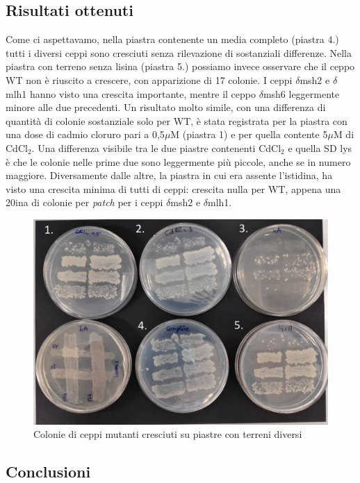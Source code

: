  \subsection*{Risultati ottenuti}
	Come ci aspettavamo, nella piastra contenente un media completo (piastra 4.) tutti i diversi ceppi sono cresciuti senza rilevazione di sostanziali differenze. Nella piastra con terreno senza lisina (piastra 5.) possiamo invece osservare che il ceppo WT non è riuscito a crescere, con apparizione di 17 colonie. I ceppi $\delta$msh2 e $\delta$mlh1 hanno visto una crescita importante, mentre il ceppo $\delta$msh6 leggermente minore alle due precedenti. Un risultato molto simile, con una differenza di quantità di colonie sostanziale solo per WT, è stata registrata per la piastra con una dose di cadmio cloruro pari a 0,5$\mu$M (piastra 1) e per quella contente 5$\mu$M di CdCl$_{2}$. Una differenza visibile tra le due piastre contenenti CdCl$_{2}$ e quella SD lys è che le colonie nelle prime due sono leggermente più piccole, anche se in numero maggiore. Diversamente dalle altre, la piastra in cui era assente l'istidina, ha visto una crescita minima di tutti di ceppi: crescita nulla per WT, appena una 20ina di colonie per \textit{patch} per i ceppi $\delta$msh2 e $\delta$mlh1. 
	
 \begin{figure}[H]
	\centering
    \includegraphics[scale=0.4]{./Pics/geneambientemod1.jpg}
	\caption{Colonie di ceppi mutanti cresciuti su piastre con terreni diversi}
	\label{fig1}
	\end{figure}
 
 
 \subsection*{Conclusioni}
 
